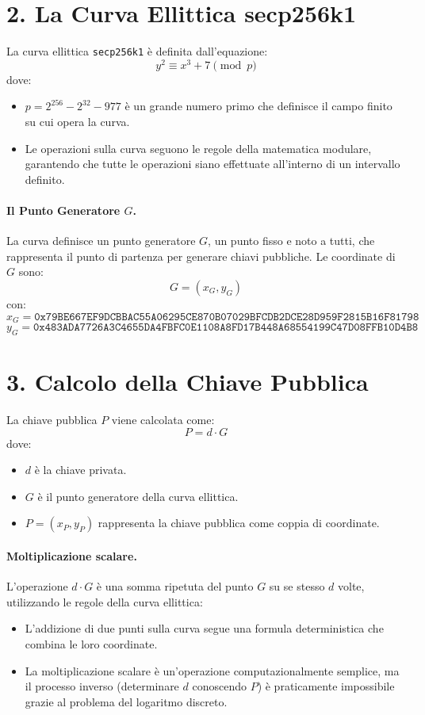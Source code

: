 \documentclass{article}
\begin{document}
\section*{2. La Curva Ellittica secp256k1}
La curva ellittica \texttt{secp256k1} è definita dall'equazione:
\[
y^2 \equiv x^3 + 7 \pmod{p}
\]
dove:
\begin{itemize}
    \item \( p = 2^{256} - 2^{32} - 977 \) è un grande numero primo che definisce il campo finito su cui opera la curva.
    \item Le operazioni sulla curva seguono le regole della matematica modulare, garantendo che tutte le operazioni siano effettuate all'interno di un intervallo definito.
\end{itemize}

\paragraph*{Il Punto Generatore \( G \).} La curva definisce un punto generatore \( G \), un punto fisso e noto a tutti, che rappresenta il punto di partenza per generare chiavi pubbliche. Le coordinate di \( G \) sono:
\[
G = (x_G, y_G)
\]
con:
\[
x_G = \texttt{0x79BE667EF9DCBBAC55A06295CE870B07029BFCDB2DCE28D959F2815B16F81798}
\]
\[
y_G = \texttt{0x483ADA7726A3C4655DA4FBFC0E1108A8FD17B448A68554199C47D08FFB10D4B8}
\]

\section*{3. Calcolo della Chiave Pubblica}
La chiave pubblica \( P \) viene calcolata come:
\[
P = d \cdot G
\]
dove:
\begin{itemize}
    \item \( d \) è la chiave privata.
    \item \( G \) è il punto generatore della curva ellittica.
    \item \( P = (x_P, y_P) \) rappresenta la chiave pubblica come coppia di coordinate.
\end{itemize}

\paragraph*{Moltiplicazione scalare.} L'operazione \( d \cdot G \) è una somma ripetuta del punto \( G \) su se stesso \( d \) volte, utilizzando le regole della curva ellittica:
\begin{itemize}
    \item L'addizione di due punti sulla curva segue una formula deterministica che combina le loro coordinate.
    \item La moltiplicazione scalare è un'operazione computazionalmente semplice, ma il processo inverso (determinare \( d \) conoscendo \( P \)) è praticamente impossibile grazie al problema del logaritmo discreto.
\end{itemize}
\end{document}
